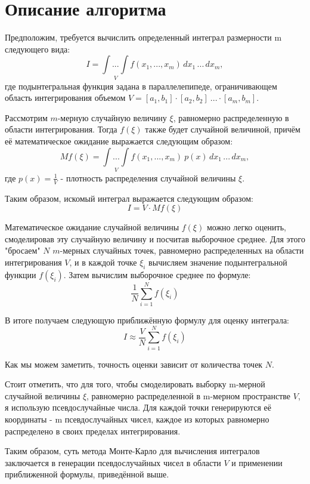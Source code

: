 \documentclass{report}
\begin{document}
\section*{Описание алгоритма}
\par Предположим, требуется вычислить определенный интеграл размерности m следующего вида:
$$I = \underset{V}{\int ... \int} f(x_1, ... , x_m) \,dx_1\,...\,dx_m, $$
где подынтегральная функция задана в параллелепипеде, ограничивающем область интегрирования объемом $V=[a_1,b_1] \cdot [a_2,b_2]\ ... \cdot [a_m,b_m]$.
\par Рассмотрим $m$-мерную случайную величину $\xi$,  равномерно распределенную в области интегрирования. Тогда $f(\xi)$ также будет случайной величиной, причём её математическое ожидание выражается следующим образом:
$$Mf(\xi) = \underset{V}{\int ... \int} f(x_1, ... , x_m) \ p(x) \,dx_1\,...\,dx_m, $$
где $p(x)=\frac{1}{V}$ - плотность распределения случайной величины $\xi.$
\par Таким образом, искомый интеграл выражается следующим образом:
$$I = V \cdot Mf(\xi)$$
\par Математическое ожидание случайной величины $f(\xi)$ можно легко оценить, смоделировав эту случайную величину и посчитав выборочное среднее. Для этого "бросаем" $N$ $m$-мерных случайных точек, равномерно распределенных на области интегрирования $V$, и в каждой точке $\xi_i$ вычисляем значение подынтегральной функции $f(\xi_i)$. Затем вычислим выборочное среднее по формуле:
$$\frac{1}{N}\sum\limits_{i=1}^N f(\xi_i)$$
\par В итоге получаем следующую приближённую формулу для оценку интеграла:
$$I\approx\frac{V}{N}\sum\limits_{i=1}^N f(\xi_i)$$
\par Как мы можем заметить, точность оценки зависит от количества точек $N$.
\par Стоит отметить, что для того, чтобы смоделировать выборку m-мерной случайной величины $\xi$, равномерно распределенной в m-мерном пространстве $V$, я использую псевдослучайные числа. Для каждой точки генерируются её координаты - m псевдослучайных чисел, каждое из которых равномерно распределено в своих пределах интегрирования.
\par Таким образом, суть метода Монте-Карло для вычисления интегралов заключается в генерации псевдослучайных чисел в области $V$ и применении приближенной формулы, приведённой выше.
\newpage

\end{document}
